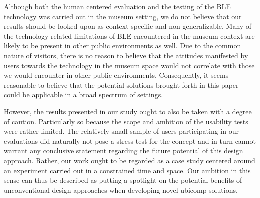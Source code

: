 \documentclass[prodmode,acmtomm]{acmsmall}
\begin{document}
Although both the human centered evaluation and the testing of the BLE technology was carried out in the museum setting, we do not believe that our results should be looked upon as context-specific and non generalizable. Many of the technology-related limitations of BLE encountered in the museum context are likely to be present in other public environments as well. Due to the common nature of visitors, there is no reason to believe that the attitudes manifested by users towards the technology in the museum space would not correlate with those we would encounter in other public environments. Consequently, it seems reasonable to believe that the potential solutions brought forth in this paper could be applicable in a broad spectrum of settings.

However, the results presented in our study ought to also be taken with a degree of caution. Particularly so because the scope and ambition of the usability tests were rather limited. The  relatively small sample of users participating in our evaluations did naturally not pose a stress test for the concept and in turn cannot warrant any conclusive statement regarding the future potential of this design approach. Rather, our work ought to be regarded as a case study centered around an experiment carried out in a constrained time and space. Our ambition in this sense can thus be described as putting a spotlight on the potential benefits of unconventional design approaches when developing novel ubicomp solutions. 
\end{document}

